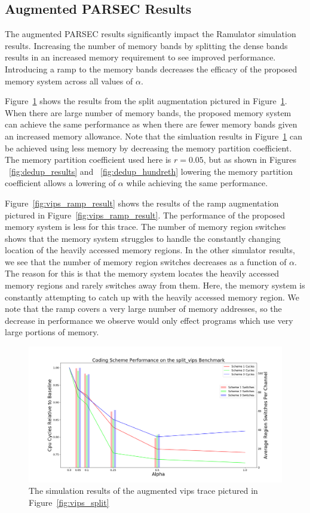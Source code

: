 \subsection{Augmented PARSEC Results}

The augmented PARSEC results significantly impact the Ramulator simulation results. Increasing the number of memory bands by splitting the dense bands results in an increased memory requirement to see improved performance. Introducing a ramp to the memory bands decreases the efficacy of the proposed memory system across all values of $\alpha$.

Figure~\ref{fig:vips_split_result} shows the results from the split augmentation pictured in Figure~\ref{fig:vips_split_result}. When there are large number of memory bands, the proposed memory system can achieve the same performance as when there are fewer memory bands given an increased memory allowance. Note that the simluation results in Figure~\ref{fig:vips_split_result} can be achieved using less memory by decreasing the memory partition coefficient. The memory partition coefficient used here is $r = 0.05$, but as shown in Figures ~\ref{fig:dedup_results} and ~\ref{fig:dedup_hundreth} lowering the memory partition coefficient allows a lowering of $\alpha$ while achieving the same performance.

Figure~\ref{fig:vips_ramp_result} shows the results of the ramp augmentation pictured in Figure~\ref{fig:vips_ramp_result}. The performance of the proposed memory system is less for this trace. The number of memory region switches shows that the memory system struggles to handle the constantly changing location of the heavily accessed memory regions. In the other simulator results, we see that the number of memory region switches decreases as a function of $\alpha$. The reason for this is that the memory system locates the heavily accessed memory regions and rarely switches away from them. Here, the memory system is constantly attempting to catch up with the heavily accessed memory region. {\color{blue}We note that the ramp covers a very large number of memory addresses, so the decrease in performance we observe would only effect programs which use very large portions of memory.} 

\begin{figure}[htbp]
		\includegraphics[width=\linewidth]{fig/vips_split_results.png}
		\caption{The simulation results of the augmented vips trace pictured in Figure~\ref{fig:vips_split}}
		\label{fig:vips_split_result}
\end{figure}

